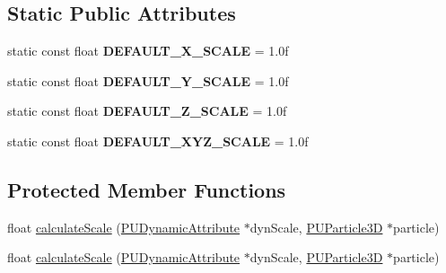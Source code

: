 \subsection*{Static Public Attributes}
\begin{DoxyCompactItemize}
\item 
\mbox{\label{classPUScaleAffector_a9665ecbb70edf0386d0afc2bc51d792b}} 
static const float {\bfseries D\+E\+F\+A\+U\+L\+T\+\_\+\+X\+\_\+\+S\+C\+A\+LE} = 1.\+0f
\item 
\mbox{\label{classPUScaleAffector_a4b9f4cec1bcce1c6969669c4bcb1bd0e}} 
static const float {\bfseries D\+E\+F\+A\+U\+L\+T\+\_\+\+Y\+\_\+\+S\+C\+A\+LE} = 1.\+0f
\item 
\mbox{\label{classPUScaleAffector_a555ccc51206eb07b75e96ff079c4a252}} 
static const float {\bfseries D\+E\+F\+A\+U\+L\+T\+\_\+\+Z\+\_\+\+S\+C\+A\+LE} = 1.\+0f
\item 
\mbox{\label{classPUScaleAffector_ad56f19f49c46c9de81478f36171c915e}} 
static const float {\bfseries D\+E\+F\+A\+U\+L\+T\+\_\+\+X\+Y\+Z\+\_\+\+S\+C\+A\+LE} = 1.\+0f
\end{DoxyCompactItemize}
\subsection*{Protected Member Functions}
\begin{DoxyCompactItemize}
\item 
float \hyperlink{classPUScaleAffector_a4a99c8bf0597163dbc7f25f8cdf69699}{calculate\+Scale} (\hyperlink{classPUDynamicAttribute}{P\+U\+Dynamic\+Attribute} $\ast$dyn\+Scale, \hyperlink{structPUParticle3D}{P\+U\+Particle3D} $\ast$particle)
\item 
float \hyperlink{classPUScaleAffector_a4a99c8bf0597163dbc7f25f8cdf69699}{calculate\+Scale} (\hyperlink{classPUDynamicAttribute}{P\+U\+Dynamic\+Attribute} $\ast$dyn\+Scale, \hyperlink{structPUParticle3D}{P\+U\+Particle3D} $\ast$particle)
\end{DoxyCompactItemize}
